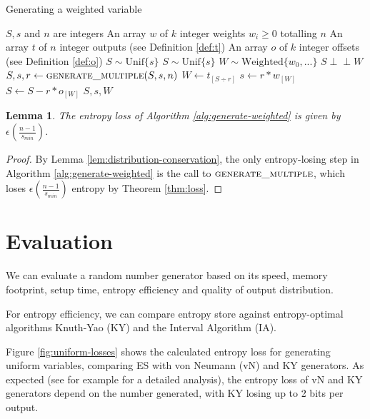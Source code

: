 \documentclass[12pt]{article}
\newtheorem{lemma}{Lemma}
\newcommand{\indep}{\perp\!\!\!\perp}
\newcommand{\unif}[1]{\mathrm{Unif}\{#1\}}
\begin{document}
\begin{algorithm}
\caption{Generating a weighted variable}
\label{alg:generate-weighted}
\begin{algorithmic}[1]
\Require $S, s$ and $n$ are integers
\Require An array $w$ of $k$ integer weights $w_i \ge 0$ totalling $n$
\Require An array $t$ of $n$ integer outputs (see Definition \ref{def:t})
\Require An array $o$ of $k$ integer offsets (see Definition \ref{def:o})
\Require $S \sim \unif{s}$
\Ensure $S \sim \unif{s}$
\Ensure $W \sim \mathrm{Weighted}\{w_0, ...\}$
\Ensure $S \indep W$
    \State $S, s, r \gets \textsc{generate\_multiple}(S, s, n)$
    \State $W \gets t_{[S \div r]}$
    \State $s \gets r * w_{[W]}$
    \State $S \gets S - r * o_{[W]}$
    \State \Return $S, s, W$
\EndProcedure
\end{algorithmic}
\end{algorithm}

\begin{lemma}
    The entropy loss of Algorithm \ref{alg:generate-weighted} is given by $\epsilon(\frac{n-1}{s_{min}})$.
\end{lemma}

\begin{proof}
    By Lemma \ref{lem:distribution-conservation}, the only entropy-losing step in Algorithm \ref{alg:generate-weighted} is the call to $\textsc{generate\_multiple}$, which loses $\epsilon(\frac{n-1}{s_{min}})$ entropy by Theorem \ref{thm:loss}.
\end{proof}

\section {Evaluation}

We can evaluate a random number generator based on its speed, memory footprint, setup time, entropy efficiency and quality of output distribution. \cite{saad2025}

For entropy efficiency, we can compare entropy store against entropy-optimal algorithms Knuth-Yao (KY) and the Interval Algorithm (IA).

Figure \ref{fig:uniform-losses} shows the calculated entropy loss for generating uniform variables, comparing ES with von Neumann (vN) and KY generators. As expected (see for example \cite{bacher2017} for a detailed analysis), the entropy loss of vN and KY generators depend on the number generated, with KY losing up to 2 bits per output.
\end{document}
